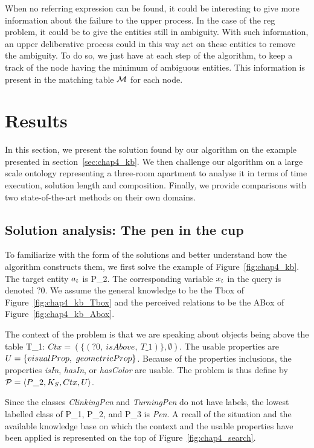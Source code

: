 When no referring expression can be found, it could be interesting to give more information about the failure to the upper process. In the case of the \acrshort{reg} problem, it could be to give the entities still in ambiguity. With such information, an upper deliberative process could in this way act on these entities to remove the ambiguity. To do so, we just have at each step of the algorithm, to keep a track of the node having the minimum of ambiguous entities. This information is present in the matching table $\mathcal{M}$ for each node.

\section{Results}

In this section, we present the solution found by our algorithm on the example presented in section~\ref{sec:chap4_kb}. We then challenge our algorithm on a large scale ontology representing a three-room apartment to analyse it in terms of time execution, solution length and composition. Finally, we provide comparisons with two state-of-the-art methods on their own domains.

\subsection{Solution analysis: The pen in the cup}

To familiarize with the form of the solutions and better understand how the algorithm constructs them, we first solve the example of Figure~\ref{fig:chap4_kb}. The target entity $a_t$ is P\_2. The corresponding variable $x_t$ in the \sparql{} query is denoted $?0$. We assume the general knowledge to be the Tbox of Figure~\ref{fig:chap4_kb_Tbox} and the perceived relations to be the ABox of Figure~\ref{fig:chap4_kb_Abox}.

The context of the problem is that we are speaking about objects being above the table T\_1: $Ctx = (\{(?0,\ isAbove,\ T\_1)\}, \emptyset)$. The usable properties are $U = \{visualProp,\ geometricProp\}$. Because of the properties inclusions, the properties \textit{isIn}, \textit{hasIn}, or \textit{hasColor} are usable. The problem is thus define by $\mathcal{P} = \langle P\_2, K_S, Ctx, U \rangle$.

Since the classes \textit{ClinkingPen} and \textit{TurningPen} do not have labels, the lowest labelled class of P\_1, P\_2, and P\_3 is \textit{Pen}. A recall of the situation and the available knowledge base on which the context and the usable properties have been applied is represented on the top of Figure~\ref{fig:chap4_search}.


